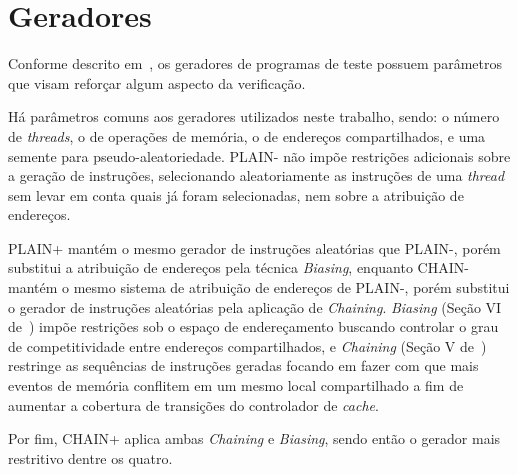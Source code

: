 \section{Geradores}

Conforme descrito em~\cite{Andrade:2017}, os geradores de programas de teste
possuem parâmetros que visam reforçar algum aspecto da verificação.

Há parâmetros comuns aos geradores utilizados neste trabalho, sendo: o número
de \textit{threads}, o de operações de memória, o de endereços compartilhados,
e uma semente para pseudo-aleatoriedade. PLAIN- não impõe restrições adicionais
sobre a geração de instruções, selecionando aleatoriamente as instruções de uma
\textit{thread} sem levar em conta quais já foram selecionadas, nem sobre a
atribuição de endereços.

PLAIN+ mantém o mesmo gerador de instruções aleatórias que PLAIN-, porém
substitui a atribuição de endereços pela técnica \textit{Biasing}, enquanto
CHAIN- mantém o mesmo sistema de atribuição de endereços de PLAIN-, porém
substitui o gerador de instruções aleatórias pela aplicação de
\textit{Chaining}. \textit{Biasing} (Seção VI de~\cite{Andrade:2019}) impõe
restrições sob o espaço de endereçamento buscando controlar o grau de
competitividade entre endereços compartilhados, e \textit{Chaining} (Seção V
de~\cite{Andrade:2019}) restringe as sequências de instruções geradas focando
em fazer com que mais eventos de memória conflitem em um mesmo local
compartilhado a fim de aumentar a cobertura de transições do controlador de
\textit{cache}.

Por fim, CHAIN+ aplica ambas \textit{Chaining} e \textit{Biasing}, sendo então
o gerador mais restritivo dentre os quatro.
